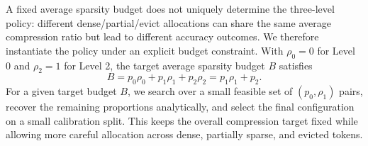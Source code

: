 \documentclass[runningheads]{llncs}
\newcommand{\method}{JSQKV}
\begin{document}
A fixed average sparsity budget does not uniquely determine the three-level policy: different dense/partial/evict allocations can share the same average compression ratio but lead to different accuracy outcomes. We therefore instantiate the policy under an explicit budget constraint. With $\rho_0 = 0$ for Level 0 and $\rho_2 = 1$ for Level 2, the target average sparsity budget $B$ satisfies
\begin{equation}
B = p_0 \rho_0 + p_1 \rho_1 + p_2 \rho_2 = p_1 \rho_1 + p_2.
\label{eq:budget_constraint}
\end{equation}
For a given target budget $B$, we search over a small feasible set of $(p_0,\rho_1)$ pairs, recover the remaining proportions analytically, and select the final configuration on a small calibration split. This keeps the overall compression target fixed while allowing more careful allocation across dense, partially sparse, and evicted tokens.


\end{document}
